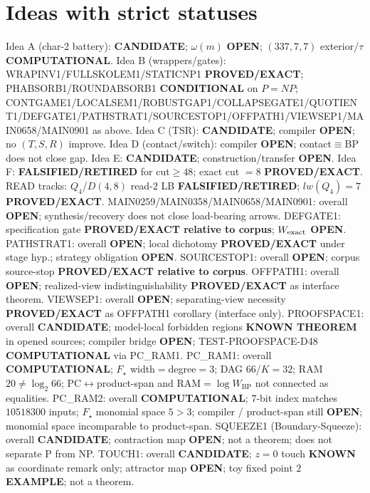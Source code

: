 \documentclass[11pt]{article}
\begin{document}
\section*{Ideas with strict statuses}
Idea A (char-2 battery): \textbf{CANDIDATE}; $\omega(m)$ \textbf{OPEN}; $(337,7,7)$ exterior/$\tau$ \textbf{COMPUTATIONAL}.
Idea B (wrappers/gates): WRAPINV1/FULLSKOLEM1/STATICNP1 \textbf{PROVED/EXACT};
PHABSORB1/ROUNDABSORB1 \textbf{CONDITIONAL} on $P=NP$;
CONTGAME1/LOCALSEM1/ROBUSTGAP1/COLLAPSEGATE1/QUOTIENT1/DEFGATE1/PATHSTRAT1/SOURCESTOP1/OFFPATH1/VIEWSEP1/MAIN0658/MAIN0901 as above.
Idea C (TSR): \textbf{CANDIDATE}; compiler \textbf{OPEN}; no $(T,S,R)$ improve.
Idea D (contact/switch): compiler \textbf{OPEN}; contact$\equiv$BP does not close gap.
Idea E: \textbf{CANDIDATE}; construction/transfer \textbf{OPEN}.
Idea F: \textbf{FALSIFIED/RETIRED} for cut$\ge48$; exact cut $=8$ \textbf{PROVED/EXACT}.
READ tracks: $Q_4$/$D(4,8)$ read-$2$ LB \textbf{FALSIFIED/RETIRED}; $lw(Q_4)=7$ \textbf{PROVED/EXACT}.
MAIN0259/MAIN0358/MAIN0658/MAIN0901: overall \textbf{OPEN}; synthesis/recovery does not close load-bearing arrows.
DEFGATE1: specification gate \textbf{PROVED/EXACT relative to corpus}; $W_{\rm exact}$ \textbf{OPEN}.
PATHSTRAT1: overall \textbf{OPEN}; local dichotomy \textbf{PROVED/EXACT} under stage hyp.; strategy obligation \textbf{OPEN}.
SOURCESTOP1: overall \textbf{OPEN}; corpus source-stop \textbf{PROVED/EXACT relative to corpus}.
OFFPATH1: overall \textbf{OPEN}; realized-view indistinguishability \textbf{PROVED/EXACT} as interface theorem.
VIEWSEP1: overall \textbf{OPEN}; separating-view necessity \textbf{PROVED/EXACT} as OFFPATH1 corollary (interface only).
PROOFSPACE1: overall \textbf{CANDIDATE}; model-local forbidden regions \textbf{KNOWN THEOREM} in opened sources;
compiler bridge \textbf{OPEN}; TEST-PROOFSPACE-D48 \textbf{COMPUTATIONAL} via PC\_RAM1.
PC\_RAM1: overall \textbf{COMPUTATIONAL}; $F_\star$ width$=$degree$=3$; DAG $66$/$K{=}32$; RAM $20\neq\log_2 66$;
PC$\leftrightarrow$product-span and RAM$=\log W_{\mathrm{BP}}$ not connected as equalities.
PC\_RAM2: overall \textbf{COMPUTATIONAL}; $7$-bit index matches $10518300$ inputs; $F_\star$ monomial space $5\gt 3$;
compiler / product-span still \textbf{OPEN}; monomial space incomparable to product-span.
SQUEEZE1 (Boundary-Squeeze): overall \textbf{CANDIDATE}; contraction map \textbf{OPEN}; not a theorem;
does not separate P from NP.
TOUCH1: overall \textbf{CANDIDATE}; $z{=}0$ touch \textbf{KNOWN} as coordinate remark only; attractor map \textbf{OPEN}; toy fixed point $2$ \textbf{EXAMPLE}; not a theorem.
\end{document}
